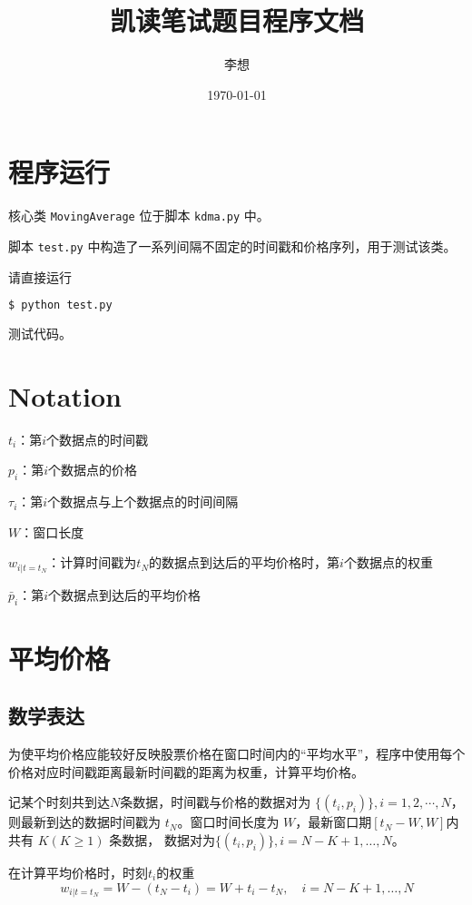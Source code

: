 \documentclass[titlepage=false]{ctexart}
\title{\textbf{凯读笔试题目程序文档}}
\author{李想}
\date{\today}
\begin{document}
\maketitle

\section{程序运行} 

核心类 \texttt{MovingAverage} 位于脚本 \texttt{kdma.py} 中。 

脚本 \texttt{test.py} 中构造了一系列间隔不固定的时间戳和价格序列，用于测试该类。

请直接运行 
\begin{lstlisting}[language=bash]
  $ python test.py
\end{lstlisting}
测试代码。


\section{Notation} 

$t_i$：第$i$个数据点的时间戳

$p_i$：第$i$个数据点的价格

$\tau_i$：第$i$个数据点与上个数据点的时间间隔

$W$：窗口长度

$w_{i|t=t_N}$：计算时间戳为$t_N$的数据点到达后的平均价格时，第$i$个数据点的权重


$\bar{p}_i$：第$i$个数据点到达后的平均价格


\section{平均价格} 

\subsection{数学表达} 
为使平均价格应能较好反映股票价格在窗口时间内的“平均水平”，程序中使用每个价格对应时间戳距离最新时间戳的距离为权重，计算平均价格。

记某个时刻共到达$N$条数据，时间戳与价格的数据对为 $\{(t_i,p_i)\}, i=1,2,\cdots,N$，
则最新到达的数据时间戳为 $t_N$。窗口时间长度为 $W$，最新窗口期$[t_N-W,W]$内共有 $K(K\ge 1)$ 条数据，
数据对为$\{(t_i,p_i)\}, i=N-K+1,\dots,N$。

在计算平均价格时，时刻$t_i$的权重 
\begin{equation}\label{eq:wt}
    w_{i|t=t_N}=W-(t_N-t_i)=W+t_i-t_N,\quad i=N-K+1,\dots,N
\end{equation}
\end{document}
